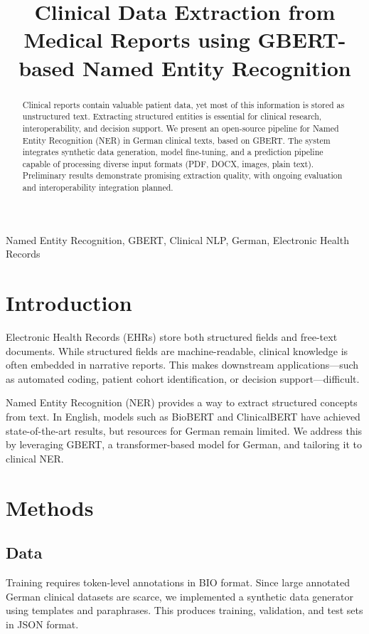 \documentclass[conference]{IEEEtran}
\title{Clinical Data Extraction from Medical Reports using GBERT-based Named Entity Recognition}
\author{
    \IEEEauthorblockN{Michele Bufano}
    \IEEEauthorblockA{
        Department of Radiology,\\
        University Medical Center Freiburg, Germany\\
        Email: michele.bufano@uniklinik-freiburg.de
    }
}
\begin{document}
\maketitle

\begin{abstract}
Clinical reports contain valuable patient data, yet most of this information is stored as unstructured text. Extracting structured entities is essential for clinical research, interoperability, and decision support. We present an open-source pipeline for Named Entity Recognition (NER) in German clinical texts, based on GBERT. The system integrates synthetic data generation, model fine-tuning, and a prediction pipeline capable of processing diverse input formats (PDF, DOCX, images, plain text). Preliminary results demonstrate promising extraction quality, with ongoing evaluation and interoperability integration planned.
\end{abstract}

\begin{IEEEkeywords}
Named Entity Recognition, GBERT, Clinical NLP, German, Electronic Health Records
\end{IEEEkeywords}

\section{Introduction}
Electronic Health Records (EHRs) store both structured fields and free-text documents. While structured fields are machine-readable, clinical knowledge is often embedded in narrative reports. This makes downstream applications---such as automated coding, patient cohort identification, or decision support---difficult.

Named Entity Recognition (NER) provides a way to extract structured concepts from text. In English, models such as BioBERT and ClinicalBERT have achieved state-of-the-art results, but resources for German remain limited. We address this by leveraging GBERT, a transformer-based model for German, and tailoring it to clinical NER.

\section{Methods}

\subsection{Data}
Training requires token-level annotations in BIO format. Since large annotated German clinical datasets are scarce, we implemented a synthetic data generator using templates and paraphrases. This produces training, validation, and test sets in JSON format.
\end{document}
